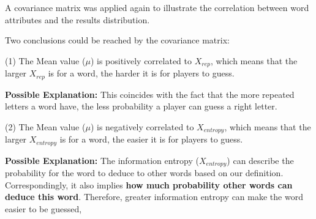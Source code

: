 \par A covariance matrix was applied again to illustrate the correlation between word attributes and the results distribution.

\par Two conclusions could be reached by the covariance matrix:

(1) The Mean value ($\mu$) is positively correlated to $X_{rep}$, which means that the larger $X_{rep}$ is for a word, the harder it is for players to guess.

\textbf{Possible Explanation:} This coincides with the fact that the more repeated letters a word have, the less probability a player can guess a right letter.

(2) The Mean value ($\mu$) is negatively correlated to $X_{entropy}$, which means that the larger $X_{entropy}$ is for a word, the easier it is for players to guess.

\textbf{Possible Explanation:} The information entropy ($X_{entropy}$) can describe the probability for the word to deduce to other words based on our definition. Correspondingly, it also implies \textbf{how much probability other words can deduce this word}. Therefore, greater information entropy can make the word easier to be guessed,




